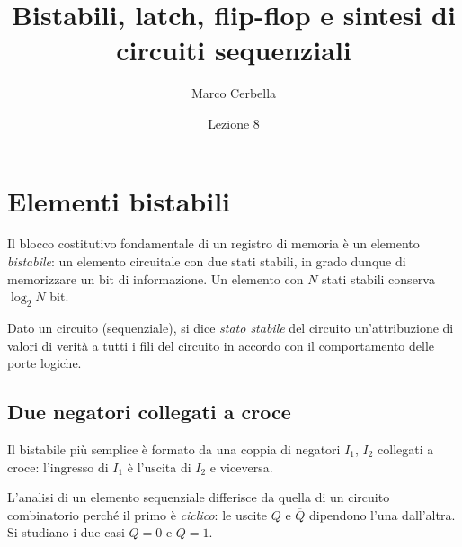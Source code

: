 \documentclass[11pt,a4paper]{article}
\title{Bistabili, latch, flip-flop e sintesi di circuiti sequenziali}
\author{Marco Cerbella}
\date{Lezione 8}
\begin{document}
\maketitle

\section{Elementi bistabili}

Il blocco costitutivo fondamentale di un registro di memoria è un elemento \emph{bistabile}: un elemento circuitale con due stati stabili, in grado dunque di memorizzare un bit di informazione. Un elemento con $N$ stati stabili conserva $\log_2 N$ bit.

\begin{definizione}
Dato un circuito (sequenziale), si dice \emph{stato stabile} del circuito un'attribuzione di valori di verità a tutti i fili del circuito in accordo con il comportamento delle porte logiche.
\end{definizione}

\subsection{Due negatori collegati a croce}

Il bistabile più semplice è formato da una coppia di negatori $I_1$, $I_2$ collegati a croce: l'ingresso di $I_1$ è l'uscita di $I_2$ e viceversa.

\begin{center}
\end{center}

L'analisi di un elemento sequenziale differisce da quella di un circuito combinatorio perché il primo è \emph{ciclico}: le uscite $Q$ e $\overline{Q}$ dipendono l'una dall'altra. Si studiano i due casi $Q = 0$ e $Q = 1$.
\end{document}
